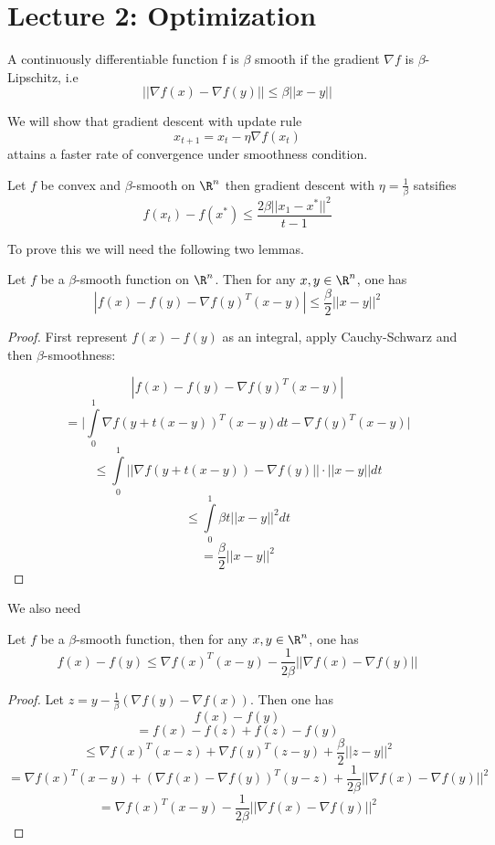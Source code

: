 \section{Lecture 2: Optimization}

A continuously differentiable function f is $\beta$ smooth if the gradient $\nabla f$ is $\beta$-Lipschitz, i.e
$$||\nabla f(x) - \nabla f(y)|| \leq \beta||x-y||$$

We will show that gradient descent  with update rule 
$$x_{t+1} = x_t - \eta \nabla f(x_t)$$
attains a faster rate of convergence under smoothness condition.  

\begin{theorem}
Let $f$ be convex and $\beta$-smooth on $\R^n$ then gradient descent with $\eta = \frac{1}{\beta}$ satsifies 
$$f(x_t) - f(x^*) \leq \frac{2\beta||x_1 - x^*||^2}{t-1}$$
\end{theorem}
To prove this we will need the following two lemmas.  

\begin{lemma}\label{l1}
Let $f$ be a $\beta$-smooth function on $\R^n$.  Then for any $x,y \in \R^n$, one has 
$$|f(x) - f(y) - \nabla f(y)^T(x-y)| \leq \frac{\beta}{2}||x-y||^2$$
\end{lemma}

\begin{proof}
First represent $f(x) - f(y)$ as an integral, apply Cauchy-Schwarz and then $\beta$-smoothness: 

$$|f(x) - f(y) - \nabla f(y)^T(x-y)|$$
$$= \big|\int\limits_{0}^1 \nabla f(y + t(x-y))^T(x-y)dt - \nabla f(y)^T(x-y)\big|$$
$$\leq  \int\limits_{0}^1 ||\nabla f(y + t(x-y)) - \nabla f(y)||\cdot ||x-y||dt$$
$$\leq \int\limits_{0}^1 \beta t||x-y||^2dt$$
$$= \frac{\beta}{2}||x-y||^2$$
\end{proof}

We also need 

\begin{lemma} \label{lm2}
Let $f$ be a $\beta$-smooth function, then for any $x,y \in \R^n$, one has 
$$f(x) - f(y)\leq \nabla f(x)^T(x-y) - \frac{1}{2\beta}||\nabla f(x) - \nabla f(y)||$$
\end{lemma}

\begin{proof}
Let $z = y - \frac{1}{\beta}(\nabla f(y) - \nabla f(x))$.  Then one has 
$$f(x) - f(y)$$
$$= f(x) - f(z) + f(z) - f(y)$$
$$\leq \nabla f(x)^T(x-z) + \nabla f(y)^T(z-y) + \frac{\beta}{2}||z-y||^2$$
$$= \nabla f(x)^T(x-y) + (\nabla f(x) - \nabla f(y))^T(y-z) + \frac{1}{2\beta}||\nabla f(x) - \nabla f(y)||^2$$
$$= \nabla f(x)^T(x-y) - \frac{1}{2\beta} ||\nabla f(x) - \nabla f(y)||^2$$
\end{proof}

